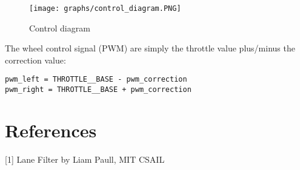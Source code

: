 \documentclass{article}
\begin{document}
\begin{figure}[ht]
  \label{fig:control_diagram}
  \centering
  \texttt{[image: graphs/control\_diagram.PNG]}
  \caption{Control diagram}
\end{figure}
\FloatBarrier

\noindent The wheel control signal (PWM) are simply the throttle value plus/minus the correction value:

\begin{lstlisting}
pwm_left = THROTTLE__BASE - pwm_correction
pwm_right = THROTTLE__BASE + pwm_correction
\end{lstlisting}

\clearpage

\section{References}

[1] Lane Filter by Liam Paull, MIT CSAIL
\end{document}
